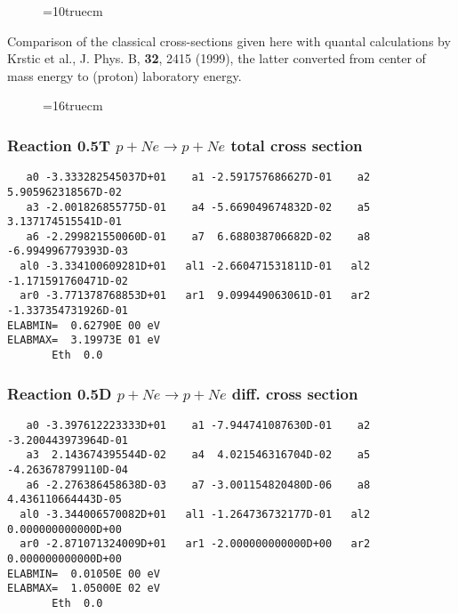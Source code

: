 \documentclass[12pt,dvipdfmx]{article}
\begin{document}
\begin{figure}[hb] \label{0.3a}
\epsfxsize=10truecm
\end{figure}
Comparison of the classical cross-sections given here with quantal calculations
by Krstic et al., J. Phys. B, \textbf{32}, 2415 (1999), the latter converted from center of mass energy to (proton) laboratory energy.
\clearpage
\newpage

\begin{figure} \label{0.3}
\epsfxsize=16truecm
\end{figure}
\newpage



\subsubsection{
Reaction 0.5T   $ p + Ne \rightarrow p + Ne $ total cross
section }



\begin{small}\begin{verbatim}
   a0 -3.333282545037D+01    a1 -2.591757686627D-01    a2  5.905962318567D-02
   a3 -2.001826855775D-01    a4 -5.669049674832D-02    a5  3.137174515541D-01
   a6 -2.299821550060D-01    a7  6.688038706682D-02    a8 -6.994996779393D-03
  al0 -3.334100609281D+01   al1 -2.660471531811D-01   al2 -1.171591760471D-02
  ar0 -3.771378768853D+01   ar1  9.099449063061D-01   ar2 -1.337354731926D-01
ELABMIN=  0.62790E 00 eV
ELABMAX=  3.19973E 01 eV
       Eth  0.0
\end{verbatim}\end{small}

\subsubsection{
Reaction 0.5D    $p + Ne \rightarrow p + Ne  $ diff. cross
section }


\begin{small}\begin{verbatim}
   a0 -3.397612223333D+01    a1 -7.944741087630D-01    a2 -3.200443973964D-01
   a3  2.143674395544D-02    a4  4.021546316704D-02    a5 -4.263678799110D-04
   a6 -2.276386458638D-03    a7 -3.001154820480D-06    a8  4.436110664443D-05
  al0 -3.344006570082D+01   al1 -1.264736732177D-01   al2  0.000000000000D+00
  ar0 -2.871071324009D+01   ar1 -2.000000000000D+00   ar2  0.000000000000D+00
ELABMIN=  0.01050E 00 eV
ELABMAX=  1.05000E 02 eV
       Eth  0.0
\end{verbatim}\end{small}
\end{document}
